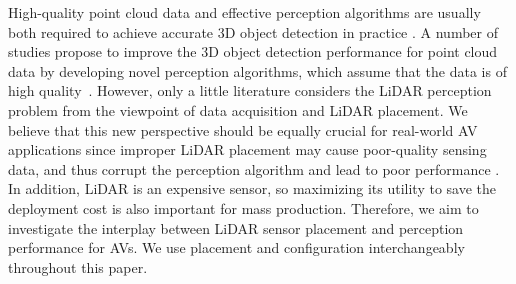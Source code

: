 \documentclass[10pt,twocolumn,letterpaper]{article}
\begin{document}
High-quality point cloud data  and effective perception algorithms are usually both required to achieve accurate 3D object detection in practice \cite{xu2021spg}. A number of studies propose to improve the 3D object detection performance for point cloud data by developing novel perception algorithms, which assume that the data is of high quality~\cite{shi2020points,shi2019pointrcnn, lang2019pointpillars, yan2018second, deng2020voxel}. However, only a little literature considers the LiDAR perception problem from the viewpoint of data acquisition \cite{liu2019should,kini2020sensor,ma2021perception} and LiDAR placement. We believe that this new perspective should be equally crucial for real-world AV applications since improper LiDAR placement may cause poor-quality sensing data, and thus corrupt the perception algorithm and lead to poor performance \cite{cao2019adversarial,liu2019extending, xu2021spg, kini2020sensor,liu2019should,mou2018optimal}. In addition, LiDAR is an expensive sensor, so maximizing its utility to save the deployment cost is also important for mass production.
Therefore, we aim to investigate the interplay between LiDAR sensor placement and perception performance for AVs. We use placement and configuration interchangeably throughout this paper.

\end{document}
